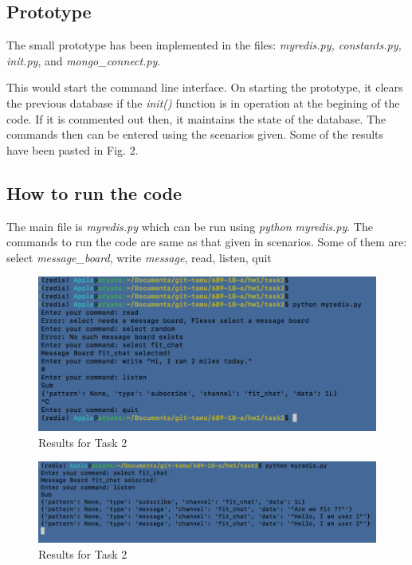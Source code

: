 \documentclass[letterpaper]{article}
\begin{document}
\subsection{Prototype}

The small prototype has been implemented in the files: \textit{myredis.py, constants.py, init.py}, and \textit{mongo\_connect.py}.

This would start the command line interface. On starting the prototype, it clears the previous database if the \textit{init()} function is in operation at the begining of the code. If it is commented out then, it maintains the state of the database. The commands then can be entered using the scenarios given. Some of the results have been pasted in Fig. 2. 

\subsection{How to run the code}

The main file is \textit{myredis.py} which can be run using \textit{python myredis.py}. The commands to run the code are same as that given in scenarios. Some of them are: select \textit{message\_board}, write \textit{message}, read, listen, quit
 
\begin{figure}
	\centering
	\includegraphics[width=1\textwidth]{2.png}
	\caption{\label{fig:data}Results for Task 2}
\end{figure}

\begin{figure}
	\centering
	\includegraphics[width=1\textwidth]{3.png}
	\caption{\label{fig:data}Results for Task 2}
\end{figure}
\end{document}
